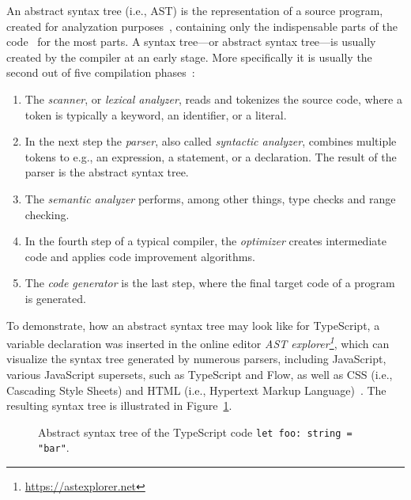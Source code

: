 An abstract syntax tree (i.e., AST) is the representation of a source program, created for analyzation purposes~\cite[p.~19]{CompilersAndInterpreters:Kenneth:2004}, containing only the indispensable parts of the code~\cite[p.~12]{FormaleSprachenAbstrakteAutomatenUndCompiler:Wagenknecht:2014} for the most parts. A syntax tree---or abstract syntax tree---is usually created by the compiler at an early stage. More specifically it is usually the second out of five compilation phases~\cite[pp.~2--3]{CompilersAndInterpreters:Kenneth:2004}: 
\begin{enumerate}
  \item The \emph{scanner}, or \emph{lexical analyzer}, reads and tokenizes the source code, where a token is typically a keyword, an identifier, or a literal.
  \item In the next step the \emph{parser}, also called \emph{syntactic analyzer}, combines multiple tokens to e.g., an expression, a statement, or a declaration. The result of the parser is the abstract syntax tree.
  \item The \emph{semantic analyzer} performs, among other things, type checks and range checking.
  \item In the fourth step of a typical compiler, the \emph{optimizer} creates intermediate code and applies code improvement algorithms.
  \item The \emph{code generator} is the last step, where the final target code of a program is generated.
\end{enumerate}
To demonstrate, how an abstract syntax tree may look like for TypeScript, a variable declaration was inserted in the online editor \emph{AST explorer\footnote{\url{https://astexplorer.net}}}, which can visualize the syntax tree generated by numerous parsers, including JavaScript, various JavaScript supersets, such as TypeScript and Flow, as well as CSS (i.e., Cascading Style Sheets) and HTML (i.e., Hypertext Markup Language)~\cite{ASTExplorer}. The resulting syntax tree is illustrated in Figure~\ref{fig:ast}.

\begin{figure}
\centering

\caption{Abstract syntax tree of the TypeScript code \texttt{let foo: string = "bar"}.}
\label{fig:ast}
\end{figure}
